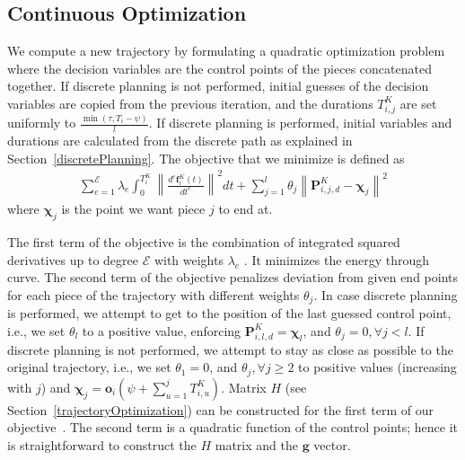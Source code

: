 \documentclass{svproc}
\newcommand{\vP}{\mathbf{P}}
\newcommand{\vg}{\mathbf{g}}
\newcommand{\vf}{\mathbf{f}}
\newcommand{\vo}{\mathbf{o}}
\newcommand{\vchi}{\mathbf{\chi}}
\newcommand{\cE}{\mathcal{E}}
\begin{document}

\subsection{Continuous Optimization}\label{continuousOptimization}
We compute a new trajectory by formulating a quadratic optimization problem where the decision variables are the control points of the pieces concatenated together.
If discrete planning is not performed, initial guesses of the decision variables are copied from the previous iteration, and the durations $T^{K}_{i,j}$ are set uniformly to $\frac{\min(\tau,T_i-\psi)}{l}$.
If discrete planning is performed, initial variables and durations are calculated from the discrete path as explained in Section~\ref{discretePlanning}.
The objective that we minimize is defined as
\begin{align}
    \sum_{e=1}^{\cE} \lambda_e\int_{0}^{T^K_i} \left\|\frac{d^e\vf^{K}_i(t)}{dt^e}\right\|^2dt + \sum_{j=1}^{l} \theta_j \left\|\vP^{K}_{i,j,d} - \vchi_{j}\right\|^2 \label{costFunction}
\end{align}
where $\vchi_j$ is the point we want piece $j$ to end at.

The first term of the objective is the combination of integrated squared derivatives up to degree $\cE$ with weights $\lambda_e$ \cite{crazyplanning-ieeetro}. It minimizes the energy through curve. %
The second term of the objective penalizes deviation from given end points for each piece of the trajectory with different weights $\theta_j$.
In case discrete planning is performed, we attempt to get to the position of the last guessed control point, i.e., we set $\theta_l$ to a positive value, enforcing $\vP^K_{i,l,d} = \vchi_l$, and $\theta_j = 0, \forall j < l$.
If discrete planning is not performed, we attempt to stay as close as possible to the original trajectory, i.e.,  we set $\theta_1 = 0$, and $\theta_j, \forall j \geq 2$ to positive values (increasing with $j$) and $\vchi_j = \vo_i(\psi + \sum_{u=1}^j T^{K}_{i,u})$.
Matrix $H$ (see Section~\ref{trajectoryOptimization}) can be constructed for the first term of our objective~\cite{crazyplanning-ieeetro}.
The second term is a quadratic function of the control points; hence it is straightforward to construct the $H$ matrix and the $\vg$ vector.
\end{document}
